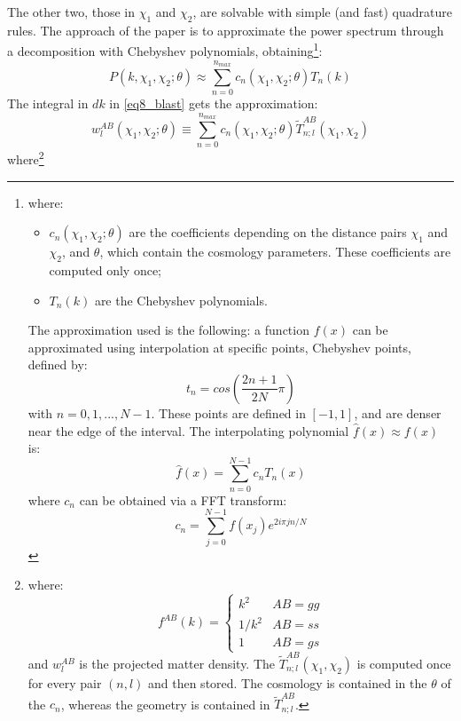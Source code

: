 The other two, those in $\chi_1$ and $\chi_2$, are solvable with simple (and fast) quadrature rules. 
The approach of the paper is to approximate the power spectrum through a decomposition with Chebyshev polynomials, obtaining\footnote{
where: 
    \begin{itemize}
        \item $c_n(\chi_1, \chi_2; \theta)$ are the coefficients depending on the distance pairs $\chi_1$ and $\chi_2$, and $\theta$, which contain the cosmology parameters. These coefficients are computed only once;
        \item $T_n(k)$ are the Chebyshev polynomials.
    \end{itemize}
The approximation used is the following: a function $f(x)$ can be approximated using interpolation at specific points, Chebyshev points, defined by: 
\begin{equation}
    t_n = cos(\frac{2n+1}{2N}\pi) 
\label{eq25_blast}
\end{equation}
with $n = 0,1,...,N-1$. These points are defined in $[-1,1]$, and are denser near the edge of the interval. The interpolating polynomial $\hat{f}(x) \approx f(x)$ is:
\begin{equation}
    \hat{f}(x) = \sum_{n=0}^{N-1} c_n T_n(x)
\label{eq26_blast}
\end{equation}
where $c_n$ can be obtained via a FFT transform:
\begin{equation}
    c_n = \sum_{j=0}^{N-1}f(x_j)e^{2i\pi j n/N}
\label{eq29_blast}
\end{equation}
}:
\begin{equation}
    P(k,\chi_1, \chi_2;\theta) \approx \sum_{n = 0}^{n_{max}} c_n(\chi_1, \chi_2; \theta) T_n(k)
\label{eq30_blast}
\end{equation}
The integral in $dk$ in \ref{eq8_blast} gets the approximation:
\begin{equation}
    w_l^{AB}(\chi_1,\chi_2;\theta) \equiv \sum_{n = 0}^{n_{max}} c_n(\chi_1, \chi_2; \theta) \tilde{T}_{n;l}^{AB}(\chi_1,\chi_2)
\label{eq31_blast}
\end{equation}
where\footnote{
where:
\begin{equation}
        f^{AB}(k) = \begin{cases} 
                k^2 & AB = gg \\
                1/k^2 & AB = ss \\
                1 & AB = gs 
                \end{cases}
    \label{eq33_blast}
    \end{equation}
and $w_l^{AB}$ is the projected matter density. The $\tilde{T}_{n;l}^{AB}(\chi_1,\chi_2)$ is computed once for every pair $(n,l)$ and then stored. The cosmology is contained in the $\theta$ of the $c_n$, whereas the geometry is contained in $\tilde{T}_{n;l}^{AB}$.
}

